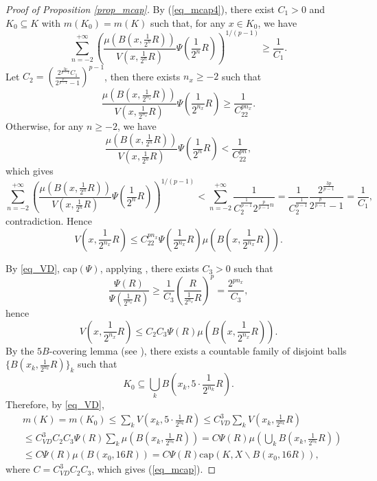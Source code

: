 \documentclass[11pt,a4paper]{article}
\numberwithin{equation}{section}
\theoremstyle{plain}
\theoremstyle{definition}
\begin{document}
\begin{proof}[Proof of Proposition \ref{prop_mcap}]
By (\ref{eq_mcap4}), there exist $C_1>0$ and $K_0\subseteq K$ with $m(K_0)=m(K)$ such that, for any $x\in K_0$, we have
$$\sum_{n=-2}^{+\infty} \left(\frac{\mu(B(x,\frac{1}{2^n}R))}{V(x,\frac{1}{2^n}R)}\Psi(\frac{1}{2^n}R)\right)^{1/(p-1)}\ge \frac{1}{C_1}.$$
Let $C_2=\left(\frac{2^{\frac{3p}{p-1}}C_1}{2^{\frac{p}{p-1}}-1}\right)^{p-1}$, then there exists $n_x\ge-2$ such that
$$\frac{\mu(B(x,\frac{1}{2^{n_x}}R))}{V(x,\frac{1}{2^{n_x}}R)}\Psi(\frac{1}{2^{n_x}}R)\ge \frac{1}{C_22^{pn_x}}.$$
Otherwise, for any $n\ge-2$, we have
$$\frac{\mu(B(x,\frac{1}{2^n}R))}{V(x,\frac{1}{2^n}R)}\Psi(\frac{1}{2^n}R)<\frac{1}{C_22^{pn}},$$
which gives
$$\sum_{n=-2}^{+\infty} \left(\frac{\mu(B(x,\frac{1}{2^n}R))}{V(x,\frac{1}{2^n}R)}\Psi(\frac{1}{2^n}R)\right)^{1/(p-1)}<\sum_{n=-2}^{+\infty}\frac{1}{C_2^{\frac{1}{p-1}}2^{\frac{p}{p-1}n}}=\frac{1}{C_2^{\frac{1}{p-1}}}\frac{2^{\frac{3p}{p-1}}}{2^{\frac{p}{p-1}}-1}=\frac{1}{C_1},$$
contradiction. Hence
$$V(x,\frac{1}{2^{n_x}}R) \le C_22^{pn_x}\Psi(\frac{1}{2^{n_x}}R)\mu(B(x,\frac{1}{2^{n_x}}R)).$$

By \ref{eq_VD}, \hyperlink{eq_cap}{$\text{cap}(\Psi)$}, applying \cite[Proposition 2.1, Remark 2.2]{Yan25a}, there exists $C_3>0$ such that
$$\frac{\Psi(R)}{\Psi(\frac{1}{2^{n_x}}R)}\ge \frac{1}{C_3}\left(\frac{R}{\frac{1}{2^{n_x}}R}\right)^p=\frac{2^{pn_x}}{C_3},$$
hence
$$V(x,\frac{1}{2^{n_x}}R)\le C_2C_3\Psi(R)\mu(B(x,\frac{1}{2^{n_x}}R)).$$
By the $5B$-covering lemma (see \cite[Theorem 1.2]{Hei01}), there exists a countable family of disjoint balls $\{B(x_k,\frac{1}{2^{n_k}}R)\}_k$ such that
$$K_0\subseteq \bigcup_{k}B(x_k,5\cdot\frac{1}{2^{n_k}}R).$$
Therefore, by \ref{eq_VD},
\begin{align*}
&m(K)=m(K_0)\le \sum_k V(x_k,5\cdot\frac{1}{2^{n_k}}R)\le C_{VD}^3\sum_k V(x_k,\frac{1}{2^{n_k}}R)\\
&\le C_{VD}^3C_2C_3\Psi(R)\sum_{k}\mu(B(x_k,\frac{1}{2^{n_k}}R))=C\Psi(R)\mu \left(\bigcup_kB(x_k,\frac{1}{2^{n_k}}R)\right)\\
&\le C\Psi(R)\mu(B(x_0,16R))=C\Psi(R)\mathrm{cap}(K,X\backslash B(x_0,16R)),
\end{align*}
where $C=C_{VD}^3C_2C_3$, which gives (\ref{eq_mcap}).
\end{proof}



%
\end{document}
